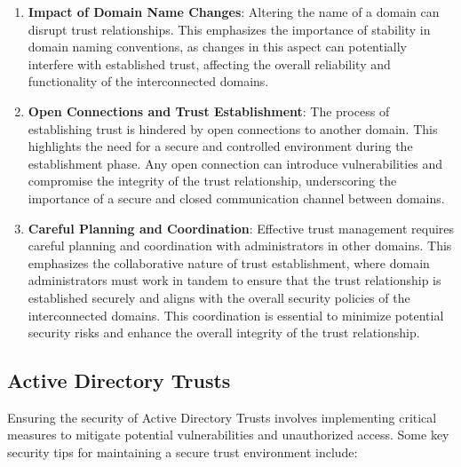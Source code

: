\begin{enumerate}
    \item \textbf{Impact of Domain Name Changes}: Altering the name of a domain can disrupt trust relationships. This emphasizes the importance of stability in domain naming conventions, as changes in this aspect can potentially interfere with established trust, affecting the overall reliability and functionality of the interconnected domains.
    \item \textbf{Open Connections and Trust Establishment}: The process of establishing trust is hindered by open connections to another domain. This highlights the need for a secure and controlled environment during the establishment phase. Any open connection can introduce vulnerabilities and compromise the integrity of the trust relationship, underscoring the importance of a secure and closed communication channel between domains.
    \item \textbf{Careful Planning and Coordination}: Effective trust management requires careful planning and coordination with administrators in other domains. This emphasizes the collaborative nature of trust establishment, where domain administrators must work in tandem to ensure that the trust relationship is established securely and aligns with the overall security policies of the interconnected domains. This coordination is essential to minimize potential security risks and enhance the overall integrity of the trust relationship.
\end{enumerate}

\subsection{Active Directory Trusts}
Ensuring the security of Active Directory Trusts involves implementing critical measures to mitigate potential vulnerabilities and unauthorized access. Some key security tips for maintaining a secure trust environment include:

